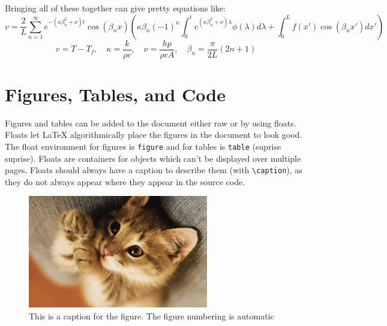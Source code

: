\documentclass{article}
\begin{document}
Bringing all of these together can give pretty equations like:
\begin{equation*}
    v = \frac{2}{L} \sum_{n=1}^\infty e^{-(\kappa \beta_n^2 + \nu) t} \cos{(\beta_nx)}
    \left(
        \kappa \beta_n(-1)^n
        \int_0^t e^{(\kappa \beta_n^2 + \nu)\lambda}\phi(\lambda) d\lambda +
        \int_0^L f(x') \cos{(\beta_nx')} dx'
    \right)
\end{equation*}
\begin{equation*}
    v = T - T_f, \quad \kappa = \frac{k}{\rho c}, \quad \nu = \frac{h p}{\rho c A}, \quad \beta_n = \frac{\pi}{2L}(2n + 1)
\end{equation*}

\newpage
\section{Figures, Tables, and Code}

Figures and tables can be added to the document either raw or by using floats. Floats let \LaTeX{} algorithmically place the figures in the document to look good. The float environment for figures is \lstinline{figure} and for tables is \lstinline{table} (suprise suprise). Floats are containers for objects which can't be displayed over multiple pages. Floats should always have a caption to describe them (with \lstinline{\caption}), as they do not always appear where they appear in the source code.

\begin{figure}[h]
    \centering
    \includegraphics[width=0.7\textwidth]{cat.jpg}
    \caption{This is a caption for the figure. The figure numbering is automatic}
    \label{fig:cat}
\end{figure}
\end{document}

